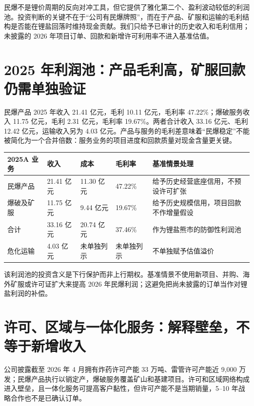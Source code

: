 民爆不是锂价周期的反向对冲工具，但它提供了雅化第二个、盈利波动较低的利润池。投资判断的关键不在于“公司有民爆牌照”，而在于产品、矿服和运输的毛利结构是否能在锂盐回落时维持现金贡献。我们只给予已审计的历史收入和毛利信用；未披露的 2026 年项目订单、回款和新增许可利用率不进入基准估值。

\section{2025 年利润池：产品毛利高，矿服回款仍需单独验证}

民爆产品 2025 年收入 21.41 亿元，毛利 10.11 亿元，毛利率 47.22\%；爆破服务收入 11.75 亿元，毛利 2.31 亿元，毛利率 19.67\%。两者合计收入 33.16 亿元、毛利 12.42 亿元，运输收入另为 4.03 亿元。产品与服务的毛利差意味着“民爆稳定”不能被简化为一个合并倍数：服务业务的项目进度和回款质量对现金含量更关键。

\begin{exhibitbox}[表 4-1：民爆与矿服的历史利润池]
\begin{tabularx}{\exhibitboxwidth}{L{3.4cm}R{2.3cm}R{2.3cm}R{2.2cm}X}
\toprule
2025A 业务 & 收入 & 成本 & 毛利率 & 基准情景处理 \\
\midrule
民爆产品 & 21.41 亿元 & 11.30 亿元 & 47.22\% & 给予历史经营底座信用，不预设许可扩张 \\
爆破及矿服 & 11.75 亿元 & 9.44 亿元 & 19.67\% & 给予历史规模信用，项目回款不作增量假设 \\
合计 & 33.16 亿元 & 20.74 亿元 & 37.46\% & 作为锂盐熊市的防御性利润池 \\
危化运输 & 4.03 亿元 & 未单独列示 & 未单独列示 & 不单独赋予估值溢价 \\
\bottomrule
\end{tabularx}
\end{exhibitbox}

该利润池的投资含义是下行保护而非上行期权。基准情景不使用新项目、并购、海外矿服或许可证扩大来提高 2026 年民爆利润；这避免把尚未披露的订单当作对锂盐利润的补偿。

\section{许可、区域与一体化服务：解释壁垒，不等于新增收入}

公司披露截至 2026 年 4 月拥有炸药许可产能 33 万吨、雷管许可产能近 9,000 万发；民爆产品执行以销定产，爆破服务覆盖矿山和基建项目。许可和区域网络构成进入壁垒，且一体化服务可提高客户黏性，但许可产能不是当期销量，5--10 年战略合作也不是已确认订单。

